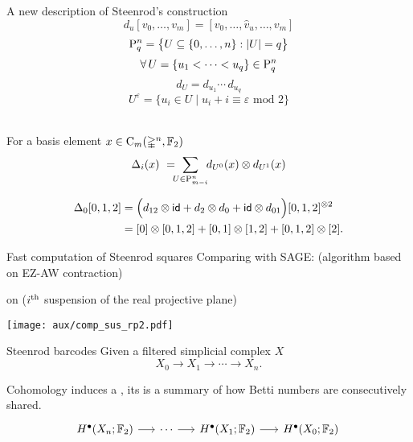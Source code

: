 \begin{frame}[fragile]{A new description of Steenrod's construction}
	\pause
	\[
	d_u[v_0, \dots, v_m] = [v_0, \dots, \widehat v_u, \dots, v_m]
	\]
	\pause\vspace*{-15pt}
	\[
	\rP_q^n = \set[\big]{U \subseteq \{0, \dots, n\} : \bars{U} = q}
	\]
	\pause\vspace*{-15pt}
	\[
	\forall \, U = \{u_1 < \dots < u_q\} \in \rP_q^n
	\]
	\pause\vspace*{-15pt}
	\[
	d_U = d_{u_1} \dotsm \, d_{u_q}
	\]
	\pause\vspace*{-15pt}
	\[
	U^\varepsilon = \big\{ u_i \in U \mid u_i + i \equiv \varepsilon \text{ mod } 2 \big\}
	\]

	\bigskip\pause
	 \\
	For a basis element $x \in \gchains_m(\gsimplex^n, \Ftwo)$
	\vspace*{-5pt}
	\[
	\Delta_i(x) \ = \!\!\! \sum_{U \in \rP_{m-i}^n} \!\! d_{U^0}(x) \otimes d_{U^1}(x)
	\]
	\vspace*{-10pt}

	\pause
	\vspace*{-5pt}
	\begin{align*}
	\Delta_0 [0,1,2] &=
	\Big( d_{12} \otimes \id + d_2 \otimes d_0 + \id \otimes d_{01} \Big) [0,1,2]^{\otimes 2} \\ &=
	[0] \otimes [0,1,2] + [0,1] \otimes [1,2] + [0,1,2] \otimes [2].
	\end{align*}
\end{frame}

\begin{frame}{Fast computation of Steenrod squares}
	\pause
	Comparing with SAGE: (algorithm based on EZ-AW contraction)

	\smallskip\pause
	 on  ($i^\th$ suspension of the real projective plane)

	\medskip
	\texttt{[image: aux/comp\_sus\_rp2.pdf]}
\end{frame}

\begin{frame}[fragile]{Steenrod barcodes}
	\pause
	Given a filtered simplicial complex $X$
	\[
	X_0 \to X_1 \to \cdots \to X_n.
	\]

	\pause
	Cohomology induces a , its  is a summary of how Betti numbers are consecutively shared.\\

	\smallskip
	\phantom{A cohomology operation induces an endomorphism}
	\[
	\begin{tikzcd}[column sep = 15]
		H^\bullet(X_n; \Ftwo) \arrow[r] & \cdots \arrow[r] & H^\bullet(X_1; \Ftwo) \arrow[r] & H^\bullet(X_0; \Ftwo) \\
		\phantom{H^\bullet(X_n; \Ftwo)} \arrow[u, "\phantom{\Sq^k}", phantom] & \phantom{\cdots} & \phantom{H^\bullet(X_1; \Ftwo)} & \phantom{H^\bullet(X_0; \Ftwo)} \arrow[u, "\phantom{\Sq^k}", phantom] \phantom{.}
	\end{tikzcd}
	\]
\end{frame}

